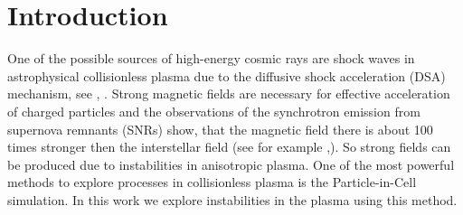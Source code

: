 \section{Introduction}
One of the possible sources of high-energy cosmic rays are shock waves in astrophysical collisionless plasma due to the diffusive shock acceleration (DSA) mechanism, see \cite{Bell1978}, \cite{Blandford1978}. Strong magnetic fields are necessary for effective acceleration of charged particles and the observations of the synchrotron emission from supernova remnants (SNRs) show, that the magnetic field there is about 100 times stronger then the interstellar field (see for example \cite{Berezhko2003},\cite{Uchiyama2007}). So strong fields can be produced due to instabilities in anisotropic plasma. One of the most powerful methods to explore processes in collisionless plasma is the Particle-in-Cell simulation. In this work we explore instabilities in the plasma using this method. 